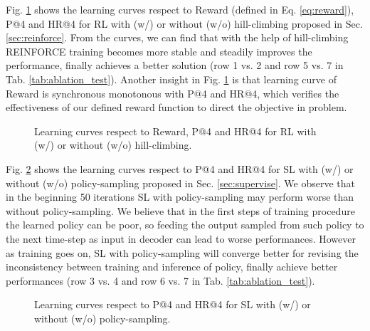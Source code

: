 Fig. \ref{fig:hill_climbing} shows the learning curves respect to Reward (defined in Eq. \ref{eq:reward}), P@4 and HR@4 for RL with (w/) or without (w/o) hill-climbing proposed in Sec. \ref{sec:reinforce}.
From the curves, we can find that with the help of hill-climbing REINFORCE training becomes more stable and steadily improves the performance, 
finally achieves a better solution (row 1 vs. 2 and row 5 vs. 7 in Tab. \ref{tab:ablation_test}).
Another insight in Fig. \ref{fig:hill_climbing} is that learning curve of Reward is synchronous monotonous with P@4 and HR@4,
which verifies the effectiveness of our defined reward function to direct the objective in problem.
\begin{figure}[th]
	\centering
	\caption{Learning curves respect to Reward, P@4 and HR@4 for RL with (w/) or without (w/o) hill-climbing.}
	\label{fig:hill_climbing}
\end{figure}

Fig. \ref{fig:policy_sampling} shows the learning curves respect to P@4 and HR@4 for SL with (w/) or without (w/o) policy-sampling proposed in Sec. \ref{sec:supervise}.
We observe that in the beginning 50 iterations SL with policy-sampling may perform worse than without policy-sampling.
We believe that in the first steps of training procedure the learned policy can be poor,
so feeding the output sampled from such policy to the next time-step as input in decoder can lead to worse performances.
However as training goes on, SL with policy-sampling will converge better for revising the inconsistency between training and inference of policy,
finally achieve better performances (row 3 vs. 4 and row 6 vs. 7 in Tab. \ref{tab:ablation_test}).
\begin{figure}[th]
	\centering
	\caption{Learning curves respect to P@4 and HR@4 for SL with (w/) or without (w/o) policy-sampling.}
	\label{fig:policy_sampling}
\end{figure}


